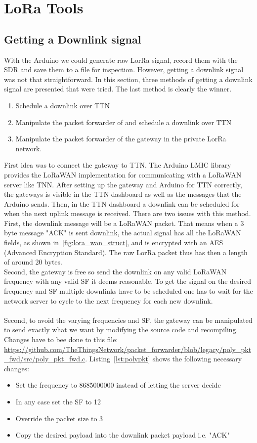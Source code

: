 \chapter{LoRa Tools}
\label{chap:lora_tools}
\section{Getting a Downlink signal}
With the Arduino we could generate raw LorRa signal, record them with the SDR and save them to a file for inspection.
However, getting a downlink signal was not that straightforward. 
In this section, three methods of getting a downlink signal are presented that were tried.
The last method is clearly the winner.

\begin{enumerate}
    \item Schedule a downlink over TTN
    \item Manipulate the packet forwarder of and schedule a downlink over TTN
    \item Manipulate the packet forwarder of the gateway in the private LorRa network.
\end{enumerate}

First idea was to connect the gateway to TTN. 
The Arduino LMIC library provides the LoRaWAN implementation for communicating with a LoRaWAN server like TNN.
After setting up the gateway and Arduino for TTN correctly, the gateways is visible in the TTN dashboard as well as 
the messages that the Arduino sends. Then, in the TTN dashboard a downlink can be scheduled for when the next uplink message 
is received. There are two issues with this method. First, the downlink message will be a LoRaWAN packet. That means when a 3 byte message "ACK"
is sent downlink, the actual signal has all the LoRaWAN fields, as shown in~\ref{fig:lora_wan_struct}, and is encrypted with an AES (Advanced Encryption Standard).
The raw LorRa packet thus has then a length of around 20 bytes.\\
Second, the gateway is free so send the downlink on any valid LoRaWAN frequency with any valid SF it deems reasonable. To get the signal on the desired frequency and SF 
multiple downlinks have to be scheduled one has to wait for the network server to cycle to the next frequency for each new downlink. 
\\
\\
Second, to avoid the varying frequencies and SF, the gateway can be manipulated to send exactly what we want by modifying the source code 
and recompiling.
Changes have to bee done to this file: \url{https://github.com/TheThingsNetwork/packet_forwarder/blob/legacy/poly_pkt_fwd/src/poly_pkt_fwd.c}.
Listing~\ref{lst:polypkt} shows the following necessary changes:
\begin{itemize}
    \item Set the frequency to 8685000000 instead of letting the server decide
    \item In any case set the SF to 12
    \item Override the packet size to 3
    \item Copy the desired payload into the downlink packet payload i.e. "ACK"
\end{itemize}

